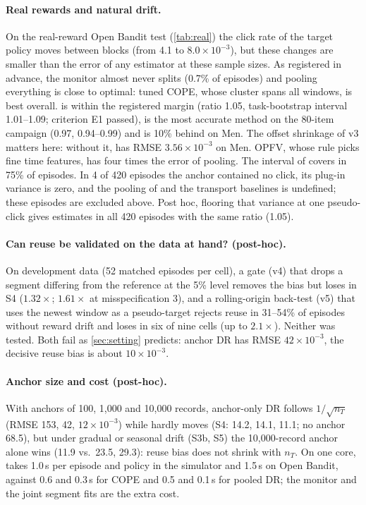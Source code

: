 

\paragraph{Real rewards and natural drift.}
On the real-reward Open Bandit test (\cref{tab:real}) the click rate of the target policy moves
between blocks (from 4.1 to $8.0\times10^{-3}$), but these changes are smaller than the error
of any estimator at these sample sizes. As registered in advance, the monitor almost never
splits (0.7\% of episodes) and pooling everything is close to optimal: tuned COPE, whose
cluster spans all windows, is best overall. \odrift{} is within the registered margin
(ratio 1.05, task-bootstrap interval 1.01--1.09; criterion E1 passed), is the most accurate
method on the 80-item campaign (0.97, 0.94--0.99) and is 10\% behind on Men. The
offset shrinkage of v3 matters here: without it, \odrift{} has RMSE $3.56\times10^{-3}$ on
Men. OPFV, whose rule picks fine time features, has four times the error of pooling. The interval
of \odrift{} covers in 75\% of episodes. In 4 of 420
episodes the anchor contained no click, its plug-in variance is zero, and the pooling of \odrift{}
and the transport baselines is undefined; these episodes are excluded above. Post hoc, flooring
that variance at one pseudo-click gives estimates in all 420 episodes with the same ratio (1.05).

\paragraph{Can reuse be validated on the data at hand? (post-hoc).}
On development data (52 matched episodes per cell), a gate (v4) that drops a segment differing
from the reference at the 5\% level removes the bias but loses in S4 ($1.32\times$; $1.61\times$ at
misspecification 3), and a rolling-origin back-test (v5) that uses the newest window as a
pseudo-target rejects reuse in 31--54\% of episodes without reward drift and loses in six of nine
cells (up to $2.1\times$). Neither was tested. Both fail as \cref{sec:setting} predicts: anchor DR
has RMSE $42\times10^{-3}$, the decisive reuse bias is about $10\times10^{-3}$.

\paragraph{Anchor size and cost (post-hoc).}
With anchors of 100, 1{,}000 and 10{,}000 records, anchor-only DR follows $1/\sqrt{n_T}$ (RMSE 153, 42,
$12\times10^{-3}$) while \odrift{} hardly moves (S4: 14.2, 14.1, 11.1; no anchor 68.5), but under
gradual or seasonal drift (S3b, S5) the 10{,}000-record anchor alone wins (11.9 vs.\ 23.5, 29.3):
reuse bias does not shrink with $n_T$. On one core, \odrift{} takes 1.0\,s per episode and policy in
the simulator and 1.5\,s on Open Bandit, against 0.6 and 0.3\,s for COPE and 0.5 and 0.1\,s for
pooled DR; the monitor and the joint segment fits are the extra cost.
